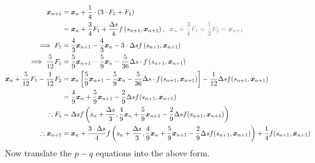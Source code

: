 \documentclass{article}
\begin{document}
\begin{align*}
	\bm{x}_{n+1}                               & = \bm{x}_n + \frac{1}{4}\cdot(3\cdot F_1 + F_2)                                                                                                                                                              \\
	                                           & = \bm{x}_n + \frac{3}{4}F_1 + \frac{\Delta s}{4}f\left(s_{n+1}, \bm{x}_{n+1}\right),\;\;\textcolor{gray}{\bm{x}_n+\frac{3}{4}F_1+\frac{1}{3}F_2=\bm{x}_{n+1}}                                                \\
	\implies F_1                               & = \frac{4}{3}\bm{x}_{n+1}-\frac{4}{3}\bm{x}_n-3\cdot\Delta sf\left(s_{n+1}, \bm{x}_{n+1}\right)                                                                                                              \\
	\implies \frac{5}{12}F_1                   & = \frac{5}{9}\bm{x}_{n+1}-\frac{5}{9}\bm{x}_n-\frac{5}{36}\Delta s\cdot f\left(s_{n+1}, \bm{x}_{n+1}\right)                                                                                                  \\
	\bm{x}_n + \frac{5}{12}F_1-\frac{1}{12}F_2 & = \bm{x}_n \left[\frac{5}{9}\bm{x}_{n+1}-\frac{5}{9}\bm{x}_n-\frac{5}{36}\Delta s\cdot f(s_{n+1}, \bm{x}_{n+1}) \right]-\frac{1}{12}\Delta s f(s_{n+1}, \bm{x}_{n+1})                                        \\
	                                           & = \frac{4}{9}\bm{x}_n+\frac{5}{9}\bm{x}_{n+1}-\frac{2}{9}\Delta s f(s_{n+1}, \bm{x}_{n+1})                                                                                                                   \\
	\therefore F_1                             & = \Delta s f\left(s_{n}+\frac{\Delta s}{3}, \frac{4}{9}\bm{x}_n+\frac{5}{9}\bm{x}_{n+1}-\frac{2}{9}\Delta s f(s_{n+1}, \bm{x}_{n+1})\right)                                                                  \\
	\therefore \bm{x}_{n+1}                    & = \bm{x}_n + \frac{3\cdot \Delta s}{4}f\left(s_{n}+\frac{\Delta s}{3}, \frac{4}{9}\bm{x}_n+\frac{5}{9}\bm{x}_{n+1}-\frac{2}{9}\Delta s f(s_{n+1}, \bm{x}_{n+1})\right) + \frac{1}{4}f(s_{n+1}, \bm{x}_{n+1})
\end{align*}
Now translate the $p-q$ equations into the above form.
\end{document}
